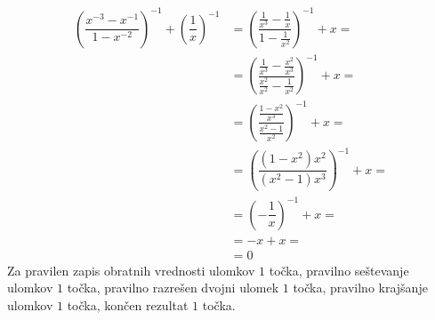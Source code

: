 \documentclass[addpoints]{exam}
\begin{document}
\begin{questions}
\begin{parts}
            \begin{solution}[7cm]
                \begin{align*}
                    \left(\dfrac{x^{-3}-x^{-1}}{1-x^{-2}}\right)^{-1}+\left(\dfrac{1}{x}\right)^{-1} &= \left(\dfrac{\frac{1}{x^3}-\frac{1}{x}}{1-\frac{1}{x^2}}\right)^{-1}+x= \\
                                                                                                    &= \left(\dfrac{\frac{1}{x^3}-\frac{x^2}{x^3}}{\frac{x^2}{x^2}-\frac{1}{x^2}}\right)^{-1}+x= \\
                                                                                                    &= \left(\dfrac{\frac{1-x^2}{x^3}}{\frac{x^2-1}{x^2}}\right)^{-1}+x= \\
                                                                                                    &= \left(\dfrac{(1-x^2)x^2}{(x^2-1)x^3}\right)^{-1}+x= \\
                                                                                                    &= \left(-\dfrac{1}{x}\right)^{-1}+x= \\
                                                                                                    &= -x+x= \\
                                                                                                    &= 0
                \end{align*}
                Za pravilen zapis obratnih vrednosti ulomkov $1$ točka,  pravilno seštevanje ulomkov $1$ točka, pravilno razrešen dvojni ulomek $1$ točka, pravilno krajšanje ulomkov $1$ točka, končen rezultat $1$ točka.
            \end{solution}
    
    

\end{parts}
\end{questions}
\end{document}
